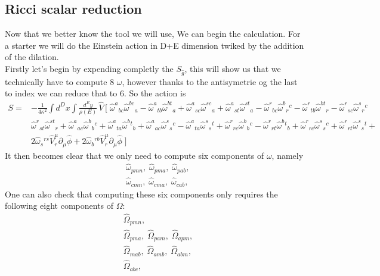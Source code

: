 \documentclass{article}
\begin{document}
\subsection{Ricci scalar reduction}
Now that we better know the tool  we will use, We can begin the calculation. For a starter we will do the Einstein action in D+E dimension twiked by the addition of the dilation.\\
Firstly let's begin by expending completly the $S_{\hat g}$, this will show us that we technically have to compute 8 $\omega$, however thanks to the antisymetrie og the last to index we can reduce that to 6.
So the action is
\begin{equation} \label{Sdexp}
\boxed{
  \begin{aligned}
S=&-\frac{1}{4\kappa^{2}}\int d^{D}x\int\frac{d^{E}y}{\rho(E)}\,\hat V\,\Big[\;
\hat\omega^a{}_{b  c}\hat \omega^{bc}{}_a
-\hat \omega^a{}_{t  b}\hat \omega^{bt}{}_a
+\hat\omega^a{}_{s  c}\hat\omega^{sc}{}_a
+\hat\omega^a{}_{s  t}\hat\omega^{st}{}_a
-\hat\omega^r{}_{b  c}\hat\omega^{b}{}_r{}^c
-\hat\omega^r{}_{t  b}\hat\omega^{bt}{}_r
-\hat\omega^r{}_{s  c}\hat\omega^{s}{}_r{}^c \\
&\hat\omega^r{}_{s  t}\hat\omega^{st}{}_r
+\hat\omega^a{}_{ac}\hat\omega^b{}_b{}^c
+\hat\omega^a{}_{ta}\hat\omega^b{}^t{}_b
+\hat\omega^a{}_{ac}\hat\omega^s{}_s{}^c 
-\hat\omega^a{}_{ta}\hat\omega^s{}_s{}^t
+\hat\omega^r{}_{rc}\hat\omega^b{}_b{}^c
-\hat\omega^r{}_{rt}\hat\omega^b{}^t{}_b
+\hat\omega^r{}_{rc}\hat\omega^s{}_s{}^c
+\hat\omega^r{}_{rt}\hat\omega^s{}_s{}^t+\\
&2\hat \omega_{ s}{}^{ r  s}\hat V^{ \mu}_{  r}\partial_{ \mu}\hat \phi
+2\hat \omega_{ b}{}^{ r  b}\hat V^{ \mu}_{  r}\partial_{ \mu}\hat \phi
\;\Big]
\end{aligned}}
\end{equation}
It then becomes clear that we only need to compute six components of $\omega$, namely
\begin{align*}
    &\hat \omega_{pmn}, \;
    \hat \omega_{pma}, \;
    \hat \omega_{pab},\\
    &\hat \omega_{cmn},\;
    \hat \omega_{cma},\;
    \hat \omega_{cab},\;
\end{align*}
One can also check that computing these six components only requires the following eight components of $\Omega$:
\begin{align*}
    &\hat \Omega_{pmn},\\
    &\hat \Omega_{pma},\;
    \hat \Omega_{pam},\;
    \hat \Omega_{apm},\\
    &\hat \Omega_{mab},\;
    \hat \Omega_{amb},\;
    \hat \Omega_{abm},\\
    &\hat \Omega_{abc},
\end{align*}
\end{document}
